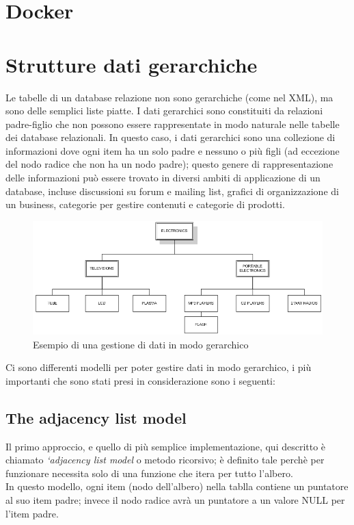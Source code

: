 \section{Docker}




\section{Strutture dati gerarchiche}
Le tabelle di un database relazione non sono gerarchiche (come nel XML), ma sono delle semplici liste piatte. I dati gerarchici sono 
constituiti da relazioni padre-figlio che non possono essere rappresentate in modo naturale nelle tabelle dei database relazionali.
In questo caso, i dati gerarchici sono una collezione di informazioni dove ogni item ha un solo padre e nessuno o più figli
(ad eccezione del nodo radice che non ha un nodo padre); questo genere di rappresentazione delle informazioni può essere trovato in 
diversi ambiti di applicazione di un database, incluse discussioni su forum e mailing list, grafici di organizzazione di un business, 
categorie per gestire contenuti e categorie di prodotti. \\

\newpage

\begin{figure}[H]
	\includegraphics[scale=0.7]{images/Hierarchical_Data_ex.PNG}
	\caption{Esempio di una gestione di dati in modo gerarchico}
	\label{fig:Hde}
\end{figure}

Ci sono differenti modelli per poter gestire dati in modo gerarchico, i più importanti che sono stati presi in considerazione sono i 
seguenti:

\subsection{The adjacency list model}
Il primo approccio, e quello di più semplice implementazione, qui descritto è chiamato \textit{‘adjacency list model} o metodo ricorsivo;
è definito tale perchè per funzionare necessita solo di una funzione che itera per tutto l'albero.\\
In questo modello, ogni item (nodo dell'albero) nella tablla contiene un puntatore al suo item padre; invece il nodo radice avrà un puntatore a un valore
NULL per l'item padre.

